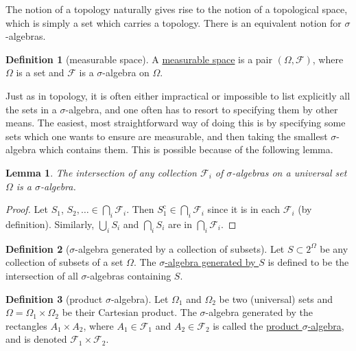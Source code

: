 \documentclass[a4paper]{scrartcl}
\newcommand{\defn}[1]{\ul{#1}}
\theoremstyle{definition}
\newtheorem{definition}{Definition}[section]
\theoremstyle{plain}
\newtheorem{lemma}{Lemma}[section]
\theoremstyle{remark}
\begin{document}
The notion of a topology naturally gives rise to the notion of a topological space, which is simply a set which carries a topology. There is an equivalent notion for $\sigma$-algebras.

\begin{definition}[measurable space]
  \label{def:measurablespace}
  A \defn{measurable space} is a pair $(\Omega, \mathcal{F})$, where $\Omega$ is a set and $\mathcal{F}$ is a $\sigma$-algebra on $\Omega$.
\end{definition}

Just as in topology, it is often either impractical or impossible to list explicitly all the sets in a $\sigma$-algebra, and one often has to resort to specifying them by other means. The easiest, most straightforward way of doing this is by specifying some sets which one wants to ensure are measurable, and then taking the smallest $\sigma$-algebra which contains them. This is possible because of the following lemma.

\begin{lemma}
  The intersection of \emph{any} collection $\mathcal{F}_{i}$ of $\sigma$-algebras on a universal set $\Omega$ is a $\sigma$-algebra.
\end{lemma}

\begin{proof}
  Let $S_{1}$, $S_{2}, \ldots \in \bigcap_{i} \mathcal{F}_{i}$. Then $S_{1}^{\mathrm{c}} \in \bigcap_{i} \mathcal{F}_{i}$ since it is in each $\mathcal{F}_{i}$ (by definition). Similarly, $\bigcup_{i} S_{i}$ and $\bigcap_{i} S_{i}$ are in $\bigcap_{i} \mathcal{F}_{i}$.
\end{proof}

\begin{definition}[$\sigma$-algebra generated by a collection of subsets]
  \label{def:generatedsigmaalgebra}
  Let $S \subset 2^{\Omega}$ be any collection of subsets of a set $\Omega$. The \defn{$\sigma$-algebra generated by $S$} is defined to be the intersection of all $\sigma$-algebras containing $S$.
\end{definition}

\begin{definition}[product $\sigma$-algebra]
  \label{def:productsigmaalgebra}
  Let $\Omega_{1}$ and $\Omega_{2}$ be two (universal) sets and $\Omega = \Omega_{1} \times \Omega_{2}$ be their Cartesian product. The $\sigma$-algebra generated by the rectangles $A_{1} \times A_{2}$, where $A_{1} \in \mathcal{F}_{1}$ and $A_{2} \in \mathcal{F}_{2}$ is called the \defn{product $\sigma$-algebra}, and is denoted $\mathcal{F}_{1} \times \mathcal{F}_{2}$.
\end{definition}
\end{document}
